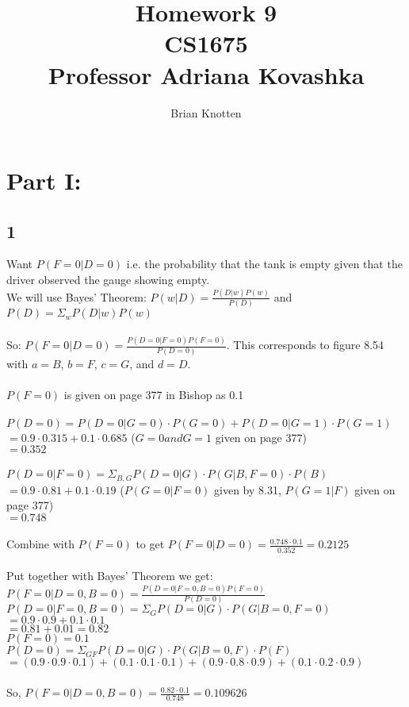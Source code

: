 \documentclass[letterpaper,notitlepage,twoside, fleqn]{article}
\begin{document}
\title{%
  Homework 9 \\
  \large CS1675 \\
  \large Professor Adriana Kovashka}
\author{Brian Knotten}
\maketitle

\section*{Part I:}
  \subsection*{1}
  Want $P(F = 0 | D = 0)$ i.e. the probability that the tank is empty given that the driver observed the gauge showing empty.\\
  We will use Bayes' Theorem: $P(w|D) = \frac{P(D|w)P(w)}{P(D)}$ and $P(D) = \Sigma_w P(D|w)P(w)$ \\\\
  So: $P(F = 0 | D = 0) = \frac{P(D = 0|F = 0)P(F = 0)}{P(D = 0)}$. This corresponds to figure 8.54 with $a = B$, $b = F$, $c = G$, and $d = D$. \\\\
  $P(F = 0)$ is given on page 377 in Bishop as 0.1 \\\\
  $P(D = 0) = P(D = 0 | G = 0) \cdot P(G = 0) + P(D = 0 | G = 1) \cdot P(G = 1)$ \\
  $= 0.9 \cdot 0.315 + 0.1 \cdot 0.685$ ($G = 0 and G = 1$ given on page 377) \\
  $= 0.352$ \\\\
  $P(D = 0 | F = 0) = \Sigma_{B, G} P(D = 0| G) \cdot P(G|B, F = 0) \cdot P(B)$ \\
  $= 0.9 \cdot 0.81 + 0.1 \cdot 0.19$  ($P(G = 0|F = 0)$ given by 8.31, $P(G = 1|F)$ given on page 377) \\
  $= 0.748$ \\\\
  Combine with $P(F = 0)$ to get $P(F = 0|D = 0) = \frac{0.748 \cdot 0.1}{0.352} = 0.2125$ \\\\
  Put together with Bayes' Theorem we get: \\
  $P(F = 0|D = 0, B = 0) = \frac{P(D = 0|F = 0, B = 0)P(F = 0)}{P(D = 0)}$ \\
  $P(D = 0|F = 0, B = 0) = \Sigma_G P(D = 0|G) \cdot P(G|B = 0, F = 0)$ \\
  $ = 0.9 \cdot 0.9 + 0.1 \cdot 0.1$ \\
  $ = 0.81 + 0.01 = 0.82$ \\
  $P(F = 0) = 0.1$ \\
  $P(D = 0) = \Sigma_{GF} P(D = 0|G) \cdot P(G|B=0, F) \cdot P(F)$ \\
  $= (0.9 \cdot 0.9 \cdot 0.1) + (0.1 \cdot 0.1 \cdot 0.1) + (0.9 \cdot 0.8 \cdot 0.9) + (0.1 \cdot 0.2 \cdot 0.9)$ \\\\
  So, $P(F = 0|D = 0, B = 0) = \frac{0.82 \cdot 0.1}{0.748} = 0.109626$
  
\end{document}
